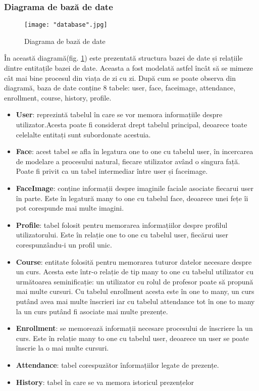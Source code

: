 \documentclass[a4paper, 12pt]{article}
\begin{document}
	\subsubsection{Diagrama de bază de date}
	\bigskip
	\begin{figure}[H]
		\centering
		\texttt{[image: "database".jpg]}
		\caption{Diagrama de bază de date}\label{fig:database}
	\end{figure}
	
	
	\quad În această diagramă(fig. \ref{fig:database}) este prezentată structura bazei de date și relațiile dintre entitațile bazei de date. Aceasta a fost modelată astfel încât să se mimeze cât mai bine procesul din viața de zi cu zi. După cum se poate observa din diagramă, baza de date conține 8 tabele: user, face, faceimage, attendance, enrollment, course, history, profile.
	\begin{itemize}
		\item \textbf{User}: reprezintă tabelul în care se vor memora informațiile despre utilizator.Acesta poate fi considerat drept tabelul principal, deoarece toate celelalte entitați sunt subordonate acestuia.
		\item \textbf{Face}: acest tabel se afla în legatura one to one cu tabelul user, în incercarea de modelare a procesului natural, fiecare utilizator având o singura față. Poate fi privit ca un tabel intermediar între user și faceimage.
		\item \textbf{FaceImage}: conține informații despre imaginile faciale asociate fiecarui user în parte. Este în legatură many to one cu tabelul face, deoarece unei fețe îi pot corespunde mai multe imagini.
		\item \textbf{Profile}: tabel folosit pentru memorarea informațiilor despre profilul utilizatorului. Este în relație one to one cu tabelul user, fiecărui user corespunzându-i un profil unic.
		\item \textbf{Course}: entitate folosită pentru memorarea tuturor datelor necesare despre un curs. Acesta este într-o relație de tip many to one cu tabelul utilizator cu următoarea seminificație: un utilizator cu rolul de profesor poate să propună mai multe cursuri. Cu tabelul enrollment acesta este în one to many, un curs putând avea mai multe înscrieri iar cu tabelul attendance tot în one to many la un curs putând fi asociate mai multe prezențe.
		\item \textbf{Enrollment}: se memorează informații necesare procesului de înscriere la un curs. Este în relație many to one cu tabelul user, deoarece un user se poate înscrie la o mai multe cursuri.
		\item \textbf{Attendance}: tabel corespuzător înformațiilor legate de prezențe.
		\item \textbf{History}:  tabel în care se va memora istoricul prezențelor
	\end{itemize}
	\newpage 
	
\end{document}
